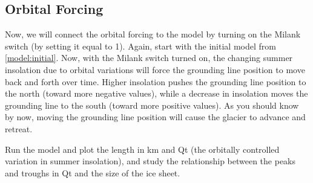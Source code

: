 \documentclass[11pt,letterpaper]{article}
\begin{document}
%
% 
%
%
%
%


\subsection{Orbital Forcing}
Now, we will connect the orbital forcing to the model by turning on the Milank switch (by setting it equal to 1). Again, start with the initial model from \ref{model:initial}. Now, with the Milank switch turned on, the changing summer insolation due to orbital variations will force the grounding line position to move back and forth over time. Higher insolation pushes the grounding line position to the north (toward more negative values), while a decrease in insolation moves the grounding line to the south (toward more positive values). As you should know by now, moving the grounding line position will cause the glacier to advance and retreat.

Run the model and plot the length in km and Qt (the orbitally controlled variation in summer insolation), and study the relationship between the peaks and troughs in Qt and the size of the ice sheet.  
\end{document}
